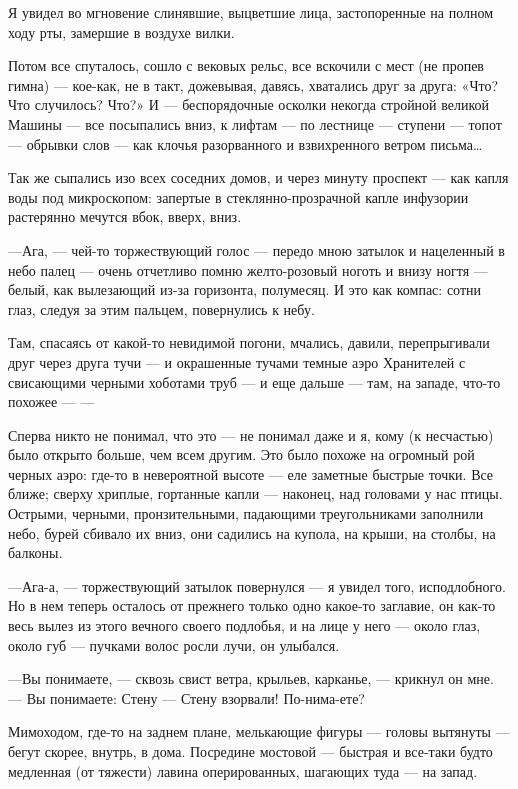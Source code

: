 \documentclass[11pt,openany]{book}
\begin{document}
Я увидел во мгновение слинявшие, выцветшие лица, застопоренные на полном ходу рты, замершие в воздухе вилки.

Потом все спуталось, сошло с вековых рельс, все вскочили с мест (не пропев гимна) --- кое-как, не в такт, дожевывая, давясь, хватались друг за друга: «Что? Что случилось? Что?» И --- беспорядочные осколки некогда стройной великой Машины --- все посыпались вниз, к лифтам --- по лестнице --- ступени --- топот --- обрывки слов --- как клочья разорванного и взвихренного ветром письма\ldots{}

Так же сыпались изо всех соседних домов, и через минуту проспект --- как капля воды под микроскопом: запертые в стеклянно-прозрачной капле инфузории растерянно мечутся вбок, вверх, вниз.

---Ага, --- чей-то торжествующий голос --- передо мною затылок и нацеленный в небо палец --- очень отчетливо помню желто-розовый ноготь и внизу ногтя --- белый, как вылезающий из-за горизонта, полумесяц. И это как компас: сотни глаз, следуя за этим пальцем, повернулись к небу.

Там, спасаясь от какой-то невидимой погони, мчались, давили, перепрыгивали друг через друга тучи --- и окрашенные тучами темные аэро Хранителей с свисающими черными хоботами труб --- и еще дальше --- там, на западе, что-то похожее --- ---

Сперва никто не понимал, что это --- не понимал даже и я, кому (к несчастью) было открыто больше, чем всем другим. Это было похоже на огромный рой черных аэро: где-то в невероятной высоте --- еле заметные быстрые точки. Все ближе; сверху хриплые, гортанные капли --- наконец, над головами у нас птицы. Острыми, черными, пронзительными, падающими треугольниками заполнили небо, бурей сбивало их вниз, они садились на купола, на крыши, на столбы, на балконы.

---Ага-а, --- торжествующий затылок повернулся --- я увидел того, исподлобного. Но в нем теперь осталось от прежнего только одно какое-то заглавие, он как-то весь вылез из этого вечного своего подлобья, и на лице у него --- около глаз, около губ --- пучками волос росли лучи, он улыбался.

---Вы понимаете, --- сквозь свист ветра, крыльев, карканье, --- крикнул он мне. --- Вы понимаете: Стену --- Стену взорвали! По-нима-ете?

Мимоходом, где-то на заднем плане, мелькающие фигуры --- головы вытянуты --- бегут скорее, внутрь, в дома. Посредине мостовой --- быстрая и все-таки будто медленная (от тяжести) лавина оперированных, шагающих туда --- на запад.
\end{document}
